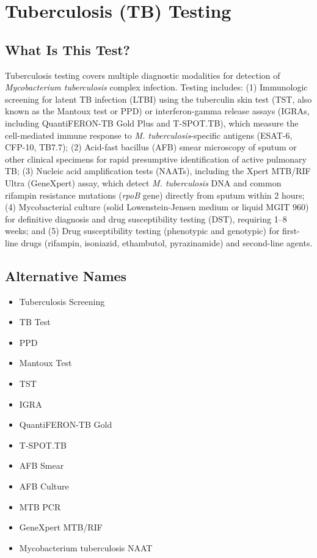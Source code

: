 \chapter{Tuberculosis (TB) Testing}

\section*{What Is This Test?}
Tuberculosis testing covers multiple diagnostic modalities for detection of \textit{Mycobacterium tuberculosis} complex infection. Testing includes: (1) Immunologic screening for latent TB infection (LTBI) using the tuberculin skin test (TST, also known as the Mantoux test or PPD) or interferon-gamma release assays (IGRAs, including QuantiFERON-TB Gold Plus and T-SPOT.TB), which measure the cell-mediated immune response to \textit{M. tuberculosis}-specific antigens (ESAT-6, CFP-10, TB7.7); (2) Acid-fast bacillus (AFB) smear microscopy of sputum or other clinical specimens for rapid presumptive identification of active pulmonary TB; (3) Nucleic acid amplification tests (NAATs), including the Xpert MTB/RIF Ultra (GeneXpert) assay, which detect \textit{M. tuberculosis} DNA and common rifampin resistance mutations (\textit{rpoB} gene) directly from sputum within 2 hours; (4) Mycobacterial culture (solid Lowenstein-Jensen medium or liquid MGIT 960) for definitive diagnosis and drug susceptibility testing (DST), requiring 1--8 weeks; and (5) Drug susceptibility testing (phenotypic and genotypic) for first-line drugs (rifampin, isoniazid, ethambutol, pyrazinamide) and second-line agents.

\section*{Alternative Names}
\begin{itemize}
  \item Tuberculosis Screening
  \item TB Test
  \item PPD
  \item Mantoux Test
  \item TST
  \item IGRA
  \item QuantiFERON-TB Gold
  \item T-SPOT.TB
  \item AFB Smear
  \item AFB Culture
  \item MTB PCR
  \item GeneXpert MTB/RIF
  \item Mycobacterium tuberculosis NAAT
\end{itemize}
